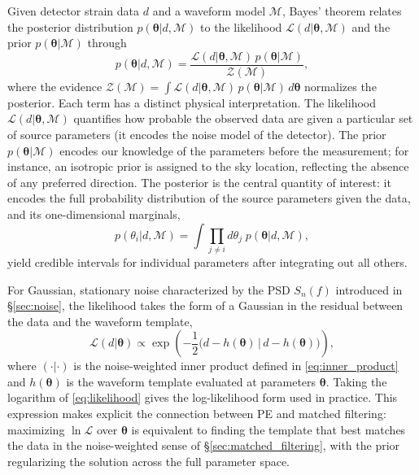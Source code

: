 Given detector strain data $d$ and a waveform model $\mathcal{M}$, Bayes' theorem relates the posterior distribution $p(\boldsymbol{\theta}|d,\mathcal{M})$ to the likelihood $\mathcal{L}(d|\boldsymbol{\theta},\mathcal{M})$ and the prior $p(\boldsymbol{\theta}|\mathcal{M})$ through
\begin{equation}
    p(\boldsymbol{\theta}|d,\mathcal{M}) = 
    \frac{\mathcal{L}(d|\boldsymbol{\theta},\mathcal{M})\,
    p(\boldsymbol{\theta}|\mathcal{M})}{\mathcal{Z}(\mathcal{M})},
    \label{eq:bayes}
\end{equation}
where the evidence $\mathcal{Z}(\mathcal{M}) = 
\int \mathcal{L}(d|\boldsymbol{\theta},\mathcal{M})\,
p(\boldsymbol{\theta}|\mathcal{M})\,d\boldsymbol{\theta}$ 
normalizes the posterior. Each term has a distinct physical 
interpretation. The likelihood $\mathcal{L}(d|\boldsymbol{\theta},\mathcal{M})$ quantifies how probable the observed data are given a particular set of source parameters (it encodes the noise model of the detector). The prior $p(\boldsymbol{\theta}|\mathcal{M})$ encodes our knowledge of the parameters before the measurement; for instance, 
an isotropic prior is assigned to the sky location, reflecting the absence of any preferred direction. The posterior is the central quantity of interest: it encodes the full probability distribution of the source parameters given the data, and its one-dimensional marginals,
\begin{equation}
    p(\theta_i|d,\mathcal{M}) = 
    \int \prod_{j\neq i} d\theta_j\; 
    p(\boldsymbol{\theta}|d,\mathcal{M}),
\end{equation}
yield credible intervals for individual parameters after integrating out all others.

For Gaussian, stationary noise characterized by the PSD $S_n(f)$ 
introduced in \S\ref{sec:noise}, the likelihood takes the form of a 
Gaussian in the residual between the data and the waveform template,
\begin{equation}
    \mathcal{L}(d|\boldsymbol{\theta}) \propto 
    \exp\!\left(-\frac{1}{2}
    \bigl(d - h(\boldsymbol{\theta})\,\big|\,
    d - h(\boldsymbol{\theta})\bigr)\right),
    \label{eq:likelihood}
\end{equation}
where $(\cdot|\cdot)$ is the noise-weighted inner product defined in \eqref{eq:inner_product} and $h(\boldsymbol{\theta})$ is the waveform template evaluated at parameters $\boldsymbol{\theta}$. Taking the logarithm of \eqref{eq:likelihood} gives the log-likelihood form used in practice. This expression makes explicit the connection between PE and matched filtering: maximizing 
$\ln\mathcal{L}$ over $\boldsymbol{\theta}$ is equivalent to finding the template that best matches the data in the noise-weighted sense of \S\ref{sec:matched_filtering}, with the prior regularizing the solution across the full parameter space.

